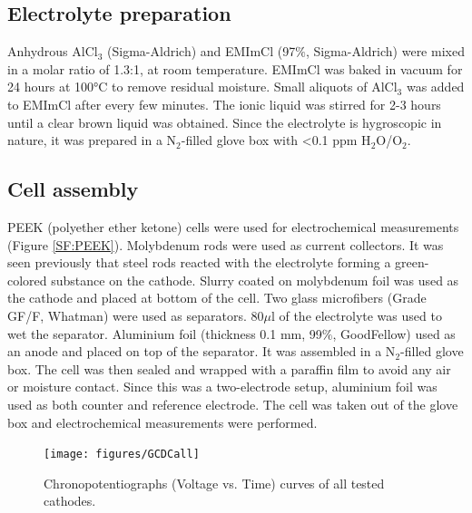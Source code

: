 \subsection{Electrolyte preparation}
Anhydrous AlCl$_3$ (Sigma-Aldrich) and EMImCl (97$\%$, Sigma-Aldrich) were mixed in a molar ratio of 1.3:1, at room temperature. EMImCl was baked in vacuum for 24 hours at 100°C to remove residual moisture. Small aliquots of AlCl$_3$ was added to EMImCl after every few minutes. The ionic liquid was stirred for 2-3 hours until a clear brown liquid was obtained. Since the electrolyte is hygroscopic in nature, it was prepared in a N$_2$-filled glove box with <0.1 ppm H$_2$O/O$_2$. 
\subsection{Cell assembly}
PEEK (polyether ether ketone) cells were used for electrochemical measurements (Figure \ref{SF:PEEK}). Molybdenum rods were used as current collectors. It was seen previously that steel rods reacted with the electrolyte forming a green-colored substance on the cathode. Slurry coated on molybdenum foil was used as the cathode and placed at bottom of the cell. Two glass microfibers (Grade GF/F, Whatman) were used as separators. 80$\mu$l of the electrolyte was used to wet the separator. Aluminium foil (thickness 0.1 mm, 99$\%$, GoodFellow) used as an anode and placed on top of the separator. It was assembled in a N$_2$-filled glove box. The cell was then sealed and wrapped with a paraffin film to avoid any air or moisture contact. Since this was a two-electrode setup, aluminium foil was used as both counter and reference electrode. The cell was taken out of the glove box and electrochemical measurements were performed. 

\begin{figure}[tbh!]
  \centering
  \texttt{[image: figures/GCDCall]}
    \caption{Chronopotentiographs (Voltage vs. Time) curves of all tested cathodes.}
  \label{figures:GCDCall}
\end{figure}

  
 


